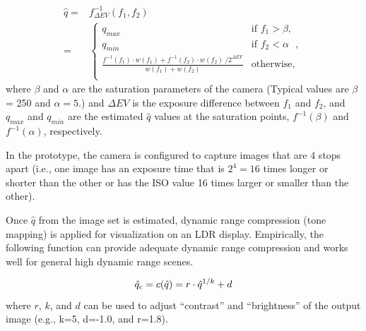 \begin{equation}\label{joint_est}
\begin{split}
  \hat{q}=&f^{-1}_{\Delta EV}(f_1, f_2) \\
  =&\begin{cases}
    q_{max}&\text{if $f_1 > \beta$}, \\
    q_{min}&\text{if $f_2 < \alpha$ }, \\
    \frac{f^{-1}(f_1) \cdot w(f_1)+f^{-1}(f_2) \cdot w(f_2) \
      / 2^{\Delta EV}}{w(f_1)+w(f_2)}& \text{otherwise},\\
\end{cases}
\end{split}
\end{equation}
where $\beta$ and $\alpha$ are the saturation parameters of the camera
(Typical values are $\beta$ = 250 and $\alpha=5$.)  and $\Delta EV$ is
the exposure difference between $f_1$ and $f_2$, and $q_{max}$ and
$q_{min}$ are the estimated $\hat{q}$ values at the saturation points,
$f^{-1}(\beta)$ and $f^{-1}(\alpha)$, respectively.

In the prototype, the camera is configured to capture images that are
4 stops apart (i.e., one image has an exposure time that is $2^4=16$
times longer or shorter than the other or has the ISO value 16 times larger or smaller than the other).

Once $\hat{q}$ from the image set is estimated, dynamic range compression (tone mapping) is 
applied for visualization on an LDR display.
Empirically, the following function can provide
adequate dynamic range compression and works well for general high
dynamic range scenes.  

\begin{equation}\label{compressor}
 \hat{q}_{c}=c(\hat{q})=
 r\cdot\hat{q}^{1/k}+d	\\
\end{equation}
where $r$, $k$, and $d$ can be used to adjust ``contrast'' and
``brightness'' of the output image (e.g., k=5, d=-1.0, and r=1.8).

